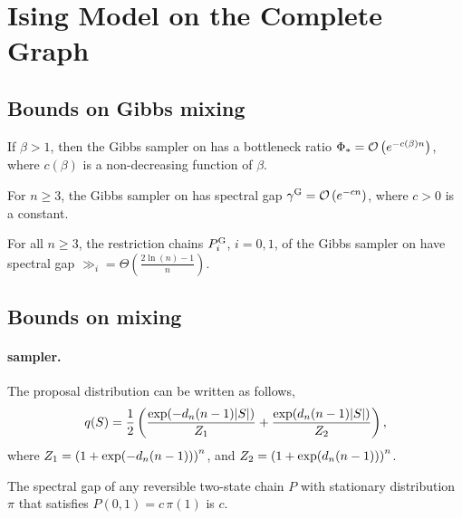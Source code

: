 \section{Ising Model on the Complete Graph}

\subsection{Bounds on Gibbs mixing}
\let\oldthetheorem\thetheorem
\renewcommand{\thetheorem}{B1}
\begin{theorem} \label{lem:gibbs_exp}
  If $\beta > 1$, then the Gibbs sampler on \isingb{} has a bottleneck ratio $\Phi_{*} = \mathcal{O}\left(e^{-c(\beta)n}\right)$, where $c(\beta)$ is a non-decreasing function of $\beta$.
\end{theorem}
\let\thetheorem\oldthetheorem

\setcounter{cor}{0}
\begin{cor}
  For $n \geq 3$, the Gibbs sampler on \ising{} has spectral gap $\gamma^{\mathrm{G}} = \mathcal{O}\left(e^{-cn}\right)$, where $c > 0$ is a constant.
\end{cor}

\begin{cor}
  For all $n \geq 3$, the restriction chains $P^{\mathrm{G}}_i$, $i = 0, 1$, of the Gibbs sampler on \ising{} have spectral gap $\gg_i = \Theta\left(\displaystyle\frac{2\ln(n) - 1}{n}\right)$.
\end{cor}

\subsection{Bounds on \Ms{} mixing}
\paragraph{\Ms{} sampler.}
The proposal distribution can be written as follows,
\begin{align} \label{eq:qdef}
  q(S) = \frac12\left( \frac{\exp(-d_n (n-1)|S|)}{Z_1} + \frac{\exp(d_n (n-1)|S|)}{Z_2}\right),
\end{align}
where $Z_1 = \left(1 + \exp(-d_n(n-1))\right)^n$, and $Z_2 = \left(1 + \exp(d_n(n-1))\right)^n$.

\let\oldthelemma\thelemma
\renewcommand{\thelemma}{B1}
\begin{lemma}  \label{lem:anari}
  The spectral gap of any reversible two-state chain $P$ with stationary distribution $\pi$ that satisfies $P(0, 1) = c\,\pi(1)$ is $c$.
\end{lemma}
\let\thelemma\oldthelemma

